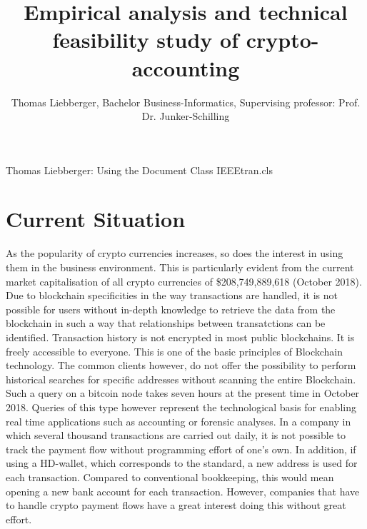 \documentclass[10pt,journal]{IEEEtran}
\begin{document}
\title{ Empirical analysis and technical feasibility study of crypto-accounting}

\author{Thomas Liebberger, Bachelor Business-Informatics, Supervising professor: Prof. Dr. Junker-Schilling}
{Thomas Liebberger: Using the Document Class IEEEtran.cls} %

\maketitle


\section{Current Situation}

As the popularity of crypto currencies increases, so does the interest in using them in the business environment. This is particularly evident from the current market capitalisation of all crypto currencies of \$208,749,889,618 (October 2018). Due to blockchain specificities in the way transactions are handled, it is not possible for users without in-depth knowledge to retrieve the data from the blockchain in such a way that relationships between transatctions can be identified.
Transaction history is not encrypted in most public blockchains. It is freely accessible to everyone. This is one of the basic principles of Blockchain technology.
The common clients however, do not offer the possibility to perform historical searches for specific addresses without scanning the entire
Blockchain. Such a query on a bitcoin node takes seven hours at the present time in October 2018.
Queries of this type however represent the technological basis for enabling real time applications such as accounting or forensic analyses.
In a company in which several thousand transactions are carried out daily, it is not possible to track the payment flow without programming effort of one's own. In addition, if using a HD-wallet, which corresponds to the standard, a new address is used for each transaction. Compared to conventional bookkeeping, this would mean opening a new bank account for each transaction.
However, companies that have to handle crypto payment flows have a great interest doing this without great effort.
\end{document}
